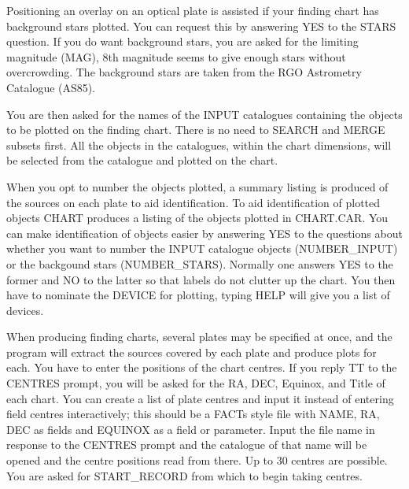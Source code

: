 Positioning an overlay on an optical plate is assisted if your
finding chart has background stars plotted.  
You can request this by answering YES to the STARS question.  
If you do want background stars, you are asked for the limiting magnitude 
(MAG), 8th magnitude seems to give enough stars without overcrowding.
The background stars are taken from the RGO Astrometry Catalogue (AS85).
 
You are then asked for the names of the INPUT catalogues containing
the objects to be plotted on the finding chart.  
There is no need to SEARCH and MERGE subsets first.
All the objects in the catalogues, within the chart dimensions, will be 
selected from the catalogue and plotted on the chart.
 
When you opt to number the objects plotted, a summary listing is produced 
of the sources on each plate to aid identification.
To aid identification of plotted objects CHART produces
a listing of the objects plotted in CHART.CAR.  
You can make identification of objects easier by answering YES to the
questions about whether you want to number the INPUT catalogue
objects (NUMBER\_INPUT) or the backgound stars (NUMBER\_STARS).
Normally one answers YES to the former and NO to the latter
so that labels do not clutter up the chart.
You then have to nominate the DEVICE for plotting, typing HELP
will give you a list of devices.
 
When producing finding charts, several plates may be specified at once, and the
program will extract the sources covered by each plate and produce plots for
each.
You have to enter the positions of the chart centres.  
If you reply TT to the CENTRES prompt, you will be asked for the  
RA, DEC, Equinox, and Title of each chart.  
You can create a list of plate centres and input it instead of entering field
centres interactively; this should be a FACTs style file with NAME, RA, DEC as
fields and EQUINOX as a field or parameter.
Input the file name in response to the CENTRES prompt and
the catalogue of that name will be opened and the centre positions
read from there. 
Up to 30 centres are possible.  
You are asked for START\_RECORD from which to begin taking centres.


